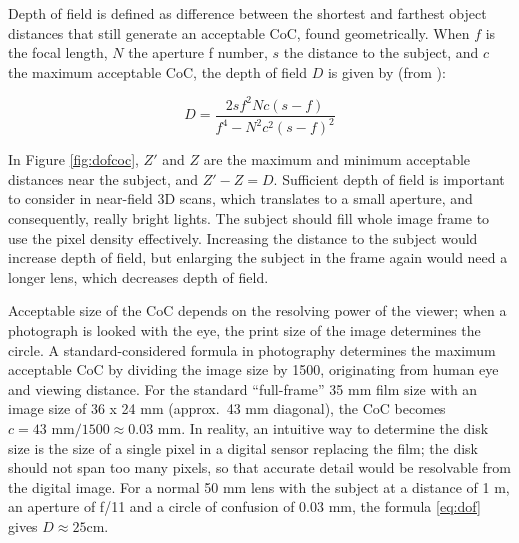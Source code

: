 Depth of field is defined as difference between the shortest and farthest object distances that still generate an acceptable CoC, found geometrically.
When $f$ is the focal length, $N$ the aperture f number, $s$ the distance to the subject, and $c$ the maximum acceptable CoC, the depth of field $D$ is given by (from \cite{greenleaf1950photographic}):

\begin{equation} \label{eq:dof}
	D = \frac{2 s f^2 N c (s - f)} {f^4 - N^2 c^2 (s - f)^2}
\end{equation}



In Figure \ref{fig:dofcoc}, $Z'$ and $Z$ are the maximum and minimum acceptable distances near the subject, and $Z' - Z = D$.
Sufficient depth of field is important to consider in near-field 3D scans, which translates to a small aperture, and consequently, really bright lights.
The subject should fill whole image frame to use the pixel density effectively.
Increasing the distance to the subject would increase depth of field, but enlarging the subject in the frame again would need a longer lens, which decreases depth of field.

Acceptable size of the CoC depends on the resolving power of the viewer; when a photograph is looked with the eye, the print size of the image determines the circle.
A standard-considered formula in photography determines the maximum acceptable CoC by dividing the image size by 1500, originating from human eye and viewing distance.
For the standard ``full-frame'' 35 mm film size with an image size of 36 x 24 mm (approx.\ 43 mm diagonal), the CoC becomes $c = 43 \text{ mm} / 1500 \approx 0.03 \text{ mm}$.
In reality, an intuitive way to determine the disk size is the size of a single pixel in a digital sensor replacing the film;
the disk should not span too many pixels, so that accurate detail would be resolvable from the digital image.
For a normal 50 mm lens with the subject at a distance of 1 m, an aperture of f/11 and a circle of confusion of 0.03 mm, the formula \ref{eq:dof} gives $D \approx 25 \text{cm}$. %

